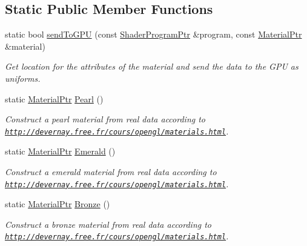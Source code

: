 \subsection*{Static Public Member Functions}
\begin{DoxyCompactItemize}
\item 
static bool \hyperlink{classMaterial_a07123357ee8a258001b6f58473662f2b}{send\+To\+G\+P\+U} (const \hyperlink{ShaderProgram_8hpp_af8e4af1ad4c53875ee5d32ab7e1f4966}{Shader\+Program\+Ptr} \&program, const \hyperlink{classMaterial_afa8bf8c90cac7c65ba73bffc15f617c9}{Material\+Ptr} \&material)
\begin{DoxyCompactList}\small\item\em Get location for the attributes of the material and send the data to the G\+P\+U as uniforms. \end{DoxyCompactList}\item 
static \hyperlink{classMaterial_afa8bf8c90cac7c65ba73bffc15f617c9}{Material\+Ptr} \hyperlink{classMaterial_a84089a03560a5f7d4c29ec771df5c5af}{Pearl} ()
\begin{DoxyCompactList}\small\item\em Construct a pearl material from real data according to \href{http://devernay.free.fr/cours/opengl/materials.html}{\tt http\+://devernay.\+free.\+fr/cours/opengl/materials.\+html}. \end{DoxyCompactList}\item 
static \hyperlink{classMaterial_afa8bf8c90cac7c65ba73bffc15f617c9}{Material\+Ptr} \hyperlink{classMaterial_acd305d40d21d94b4f45581d6e3723fe7}{Emerald} ()
\begin{DoxyCompactList}\small\item\em Construct a emerald material from real data according to \href{http://devernay.free.fr/cours/opengl/materials.html}{\tt http\+://devernay.\+free.\+fr/cours/opengl/materials.\+html}. \end{DoxyCompactList}\item 
static \hyperlink{classMaterial_afa8bf8c90cac7c65ba73bffc15f617c9}{Material\+Ptr} \hyperlink{classMaterial_ae904c5c1e6f4ef425b3dac08fbb20918}{Bronze} ()
\begin{DoxyCompactList}\small\item\em Construct a bronze material from real data according to \href{http://devernay.free.fr/cours/opengl/materials.html}{\tt http\+://devernay.\+free.\+fr/cours/opengl/materials.\+html}. \end{DoxyCompactList}\end{DoxyCompactItemize}
